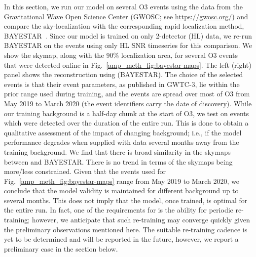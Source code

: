 \begin{refsection}
\begin{figure}
  \label{amp_meth_fig:results}
\end{figure}
In this section, we run our model on several O3 events using the data from the Gravitational Wave Open Science Center (GWOSC; see \url{https://gwosc.org/}) and compare the sky-localization with the corresponding rapid localization method, BAYESTAR~\cite{Singer_2016}. 
Since our model is trained on only 2-detector (HL) data, we re-run BAYESTAR on the events using only HL SNR timeseries for this comparison.
We show the skymap, along with the 90\% localization area, for several O3 events that were detected online in Fig.~\ref{amp_meth_fig:bayestar-maps}. 
The left (right) panel shows the reconstruction using {\amplfi} (BAYESTAR). The choice of the selected events is that their event parameters, as published in GWTC-3, lie within the prior range used during training, and the events are spread over most of O3 from May 2019 to March 2020 (the event identifiers carry the date of discovery). 
While our training background is a half-day chunk at the start of O3, we test on events which were detected over the duration of the entire run. 
This is done to obtain a qualitative assessment of the impact of changing background; i.e., if the model performance degrades when supplied with data several months away from the training background. 
We find that there is broad similarity in the skymaps between {\amplfi} and BAYESTAR. 
There is no trend in terms of the skymaps being more/less constrained.
Given that the events used for Fig.~\ref{amp_meth_fig:bayestar-maps} range from May 2019 to March 2020, we conclude that the model validity is maintained for different background up to several months. 
This does not imply that the model, once trained, is optimal for the
entire run. 
In fact, one of the requirements for {\amplfi} is the ability for periodic re-training; however, we anticipate that such re-training may converge quickly given the preliminary observations mentioned here.
The suitable re-training cadence is yet to be determined and will be reported in the future, however, we report a preliminary case in the section below.


\end{refsection}
